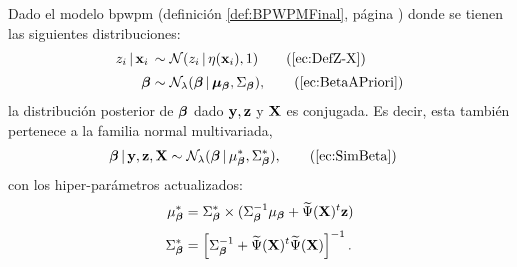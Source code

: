 \documentclass[../../Main/Main.tex]{subfiles}
\begin{document}
\begin{theorem}
Dado el modelo bpwpm (definición \ref{def:BPWPMFinal}, página \pageref{def:BPWPMFinal}) donde se tienen las siguientes distribuciones:
\begin{align}
z_i \,|\, \xni\, &\sim \mathcal{N}(z_i\,|\,\eta(\xni),1) 
	\tag{\ref{ec:DefZ-X}} \\[2pt]
\betabf &\sim \mathcal{N}_{\lambda}(\betabf\,|\,\bm{\mu}_{\betabf}, \Sigmabeta), \tag{\ref{ec:BetaAPriori}} 
\end{align}
la distribución posterior de $\bm{\beta}$ dado $\mathbf{y},\mathbf{z}$ y $\mathbf{X}$ es conjugada. Es decir, esta también pertenece a la familia normal multivariada,
\begin{align}
	\betabf\,|\,\ysn,\zsn,\xmat &\sim \mathcal{N}_{\lambda}(\betabf\,|\,\mubeta^*, \Sigmabeta^*), \tag{\ref{ec:SimBeta}}
\end{align}
con los hiper-parámetros actualizados:
\begin{align*}
	\mu_{\bm{\beta}}^* &= \Sigma_{\bm{\beta}}^* \times (\Sigma_{\bm{\beta}}^{-1}\mu_{\bm{\beta}} + \widetilde{\Psi}(\mathbf{X})^t\mathbf{z} ) \\[2pt]
	 \Sigma_{\bm{\beta}}^* &= \left[\Sigma_{\bm{\beta}}^{-1} + \widetilde{\Psi}(\mathbf{X})^t\widetilde{\Psi}(\mathbf{X})\right]^{-1}.
\end{align*}
\end{theorem}
\end{document}
